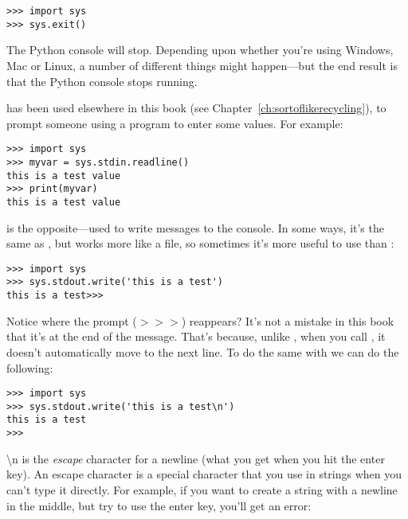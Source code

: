\begin{listingignore}
\begin{verbatim}
>>> import sys
>>> sys.exit()
\end{verbatim}
\end{listingignore}

The Python console will stop. Depending upon whether you're using Windows, Mac or Linux, a number of different things might happen---but the end result is that the Python console stops running.

 has been used elsewhere in this book (see Chapter~\ref{ch:sortoflikerecycling}), to prompt someone using a program to enter some values. For example:

\begin{listingignore}
\begin{verbatim}
>>> import sys
>>> myvar = sys.stdin.readline()
this is a test value
>>> print(myvar)
this is a test value
\end{verbatim}
\end{listingignore}

 is the opposite---used to write messages to the console. In some ways, it's the same as , but works more like a file, so sometimes it's more useful to use  than :

\begin{listingignore}
\begin{verbatim}
>>> import sys
>>> sys.stdout.write('this is a test')
this is a test>>>
\end{verbatim}
\end{listingignore}

Notice where the prompt ($>>>$) reappears?  It's not a mistake in this book that it's at the end of the message.  That's because, unlike , when you call , it doesn't automatically move to the next line. To do the same with  we can do the following:

\begin{listingignore}
\begin{verbatim}
>>> import sys
>>> sys.stdout.write('this is a test\n')
this is a test
>>>
\end{verbatim}
\end{listingignore}

\noindent
{\textbackslash}n is the \emph{escape} character for a newline (what you get when you hit the enter key).  An escape character is a special character that you use in strings when you can't type it directly. For example, if you want to create a string with a newline in the middle, but try to use the enter key, you'll get an error:

